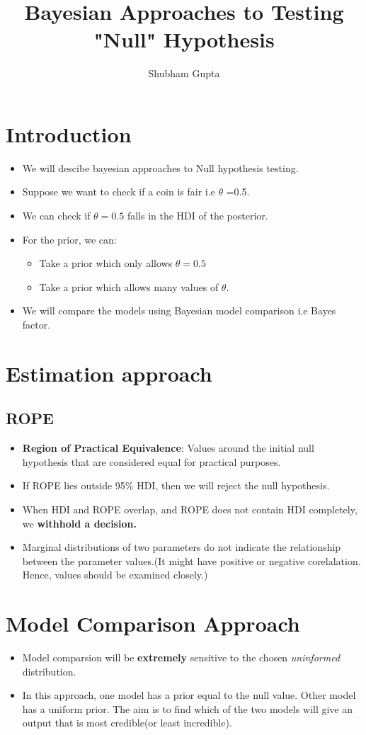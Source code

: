 \documentclass[a4paper]{article}
\title{Bayesian Approaches to Testing "Null" Hypothesis}
\author{Shubham Gupta}
\begin{document}
\maketitle
\section{Introduction}
\begin{itemize}
    \item We will descibe bayesian approaches to Null hypothesis testing.
    \item Suppose we want to check if a coin is fair i.e $\theta$ =0.5.
    \item We can check if $\theta=0.5$ falls in the HDI of the posterior.
    \item For the prior, we can:
        \begin{itemize}
            \item Take a prior which only allows $\theta=0.5$ 
            \item Take a prior which allows many values of $\theta$.
        \end{itemize}
    \item We will compare the models using Bayesian model comparison i.e Bayes factor.
\end{itemize}
\section{Estimation approach}
\subsection{ROPE}
\begin{itemize}
    \item \textbf{Region of Practical Equivalence}: Values around the initial null hypothesis that are considered equal for practical purposes. 
    \item If ROPE lies outside 95\% HDI, then we will reject the null hypothesis.
    \item When HDI and ROPE overlap, and ROPE does not contain HDI completely, we \textbf{withhold a decision.}  
    \item Marginal distributions of two parameters do not indicate the relationship between the parameter values.(It might have positive or negative corelalation. Hence, values should be examined closely.)
\end{itemize}
\section{Model Comparison Approach}
\begin{itemize}
    \item Model comparsion will be \textbf{extremely} sensitive to the chosen \textit{uninformed} distribution. 
    \item In this approach, one model has a prior equal to the null value. Other model has a uniform prior. The aim is to find which of the two models will give an output that is most credible(or least incredible).
\end{itemize}
\end{document}
